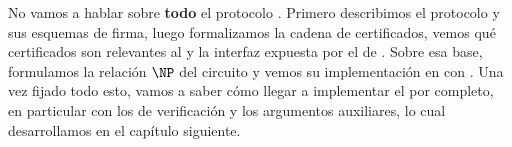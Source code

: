 No vamos a hablar sobre \textbf{todo} el protocolo \Mithril. Primero describimos el protocolo \STM y sus esquemas de firma, luego formalizamos la cadena de certificados, vemos qué certificados son relevantes al \zkBridge y la interfaz expuesta por el \MithrilAggregator de \Mithril. Sobre esa base, formulamos la relación $\NP$ del circuito \STM y vemos su implementación en \HaloTwo con \KZG. Una vez fijado todo esto, vamos a saber cómo llegar a implementar el \zkBridge por completo, en particular con los \ProofReceipt de verificación \STM y los argumentos \Groth auxiliares, lo cual desarrollamos en el capítulo siguiente.
